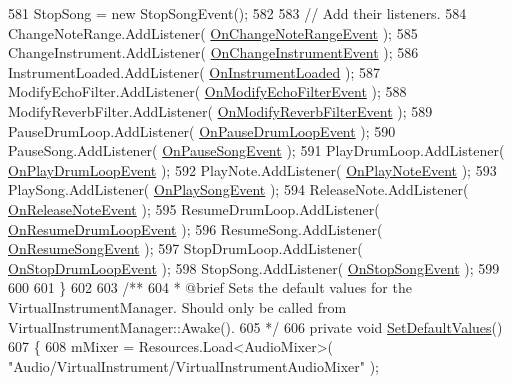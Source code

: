 \begin{DoxyCodeInclude}
581         StopSong = \textcolor{keyword}{new} StopSongEvent();
582 
583         \textcolor{comment}{// Add their listeners.}
584         ChangeNoteRange.AddListener( \hyperlink{group___v_i_m_handlers_ga660c766dceebfc830de2cf96686692df}{OnChangeNoteRangeEvent} );
585         ChangeInstrument.AddListener( \hyperlink{group___v_i_m_handlers_ga8e79286073756c31e08fecd59ce04fa7}{OnChangeInstrumentEvent} );
586         InstrumentLoaded.AddListener( \hyperlink{group___v_i_m_handlers_gac7d5b65484e450a400e32ab416ebc9f6}{OnInstrumentLoaded} );
587         ModifyEchoFilter.AddListener( \hyperlink{group___v_i_m_handlers_gae504c6ded8eb68ffb117c207fc25d99d}{OnModifyEchoFilterEvent} );
588         ModifyReverbFilter.AddListener( \hyperlink{group___v_i_m_handlers_ga2b310217971075b1b2db67d68fbbea5a}{OnModifyReverbFilterEvent} );
589         PauseDrumLoop.AddListener( \hyperlink{group___v_i_m_handlers_ga30cd7f00fea55becd6d90f0ec737510a}{OnPauseDrumLoopEvent} );
590         PauseSong.AddListener( \hyperlink{group___v_i_m_handlers_gad052b3cc53b35b25631f9b399be489ae}{OnPauseSongEvent} );
591         PlayDrumLoop.AddListener( \hyperlink{group___v_i_m_handlers_gae2e2010b9a36ae2409466181ae0b9679}{OnPlayDrumLoopEvent} );
592         PlayNote.AddListener( \hyperlink{group___v_i_m_handlers_ga80b3821df3b1488a150f6062638f105c}{OnPlayNoteEvent} );
593         PlaySong.AddListener( \hyperlink{group___v_i_m_handlers_ga7fd877a7d429403abbfd2728aa63c056}{OnPlaySongEvent} );
594         ReleaseNote.AddListener( \hyperlink{group___v_i_m_handlers_ga0f0a34c251d154131f9ea130a54dc989}{OnReleaseNoteEvent} );
595         ResumeDrumLoop.AddListener( \hyperlink{group___v_i_m_handlers_ga97e3e73e05a7ab6027f25573712367a2}{OnResumeDrumLoopEvent} );
596         ResumeSong.AddListener( \hyperlink{group___v_i_m_handlers_gaca3d2c89672fe0eb3d94b3cb2072de59}{OnResumeSongEvent} );
597         StopDrumLoop.AddListener( \hyperlink{group___v_i_m_handlers_ga9d251d8b2036a3416680ced5d6125d0e}{OnStopDrumLoopEvent} );
598         StopSong.AddListener( \hyperlink{group___v_i_m_handlers_ga5d9afb7a74107b5c6016555f0bb0a0a8}{OnStopSongEvent} );
599 
600 
601     \}
602 \textcolor{comment}{}
603 \textcolor{comment}{    /** }
604 \textcolor{comment}{     * @brief Sets the default values for the VirtualInstrumentManager. Should only be called from
       VirtualInstrumentManager::Awake().}
605 \textcolor{comment}{    */}
606     \textcolor{keyword}{private} \textcolor{keywordtype}{void} \hyperlink{group___v_i_m_priv_func_gaa9e05e51f025afb0ab5cb2a8532c8bba}{SetDefaultValues}()
607     \{
608         mMixer = Resources.Load<AudioMixer>( \textcolor{stringliteral}{"Audio/VirtualInstrument/VirtualInstrumentAudioMixer"} );

\end{DoxyCodeInclude}
